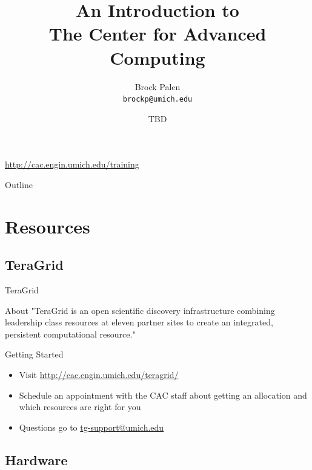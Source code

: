 \documentclass[handout]{beamer}
\title[CAC Intro] {An Introduction to\\ The Center for Advanced Computing}
\author{Brock Palen\\ \texttt{brockp@umich.edu}}
\date{TBD}
\begin{document}
  \begin{frame}
    \titlepage
    \url{http://cac.engin.umich.edu/training}
  \end{frame}

  \begin{frame}{Outline}
    \tableofcontents
  \end{frame}
  
  \section{Resources}
  \subsection {TeraGrid}
  \begin{frame}{TeraGrid}
   \begin{block}{About}
"TeraGrid is an open scientific discovery infrastructure combining leadership class resources at eleven partner sites to create an integrated, persistent computational resource."
   \end{block}
   \begin{block}{Getting Started}
    \begin{itemize}
     \item Visit \url{http://cac.engin.umich.edu/teragrid/}
     \item Schedule an appointment with the CAC staff about getting an allocation and which resources are right for you
     \item Questions go to \url{tg-support@umich.edu}
    \end{itemize}
   \end{block}
  \end{frame}

  \subsection {Hardware}
\end{document}
